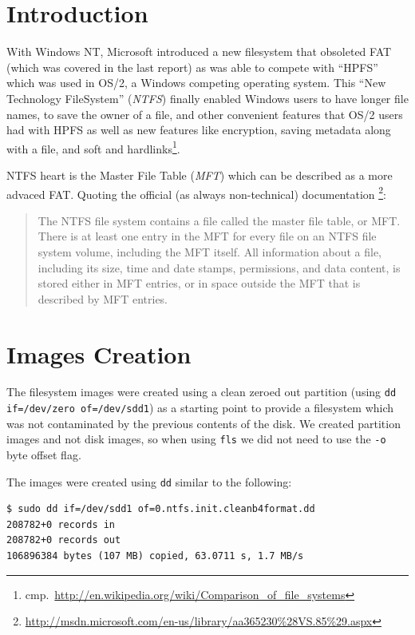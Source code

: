 \documentclass[a4paper,
    11pt,
    normalheadings,
    parindent,
    UKenglish,
    abstracton,
    ]{scrartcl}
\title{\mytitle{}}
\author{
    cand. Dipl. Inf. Tobias Müller <\href{mailto:muellet2@computing.dcu.ie?subject=ss10-forensic-lab01}{muellet2@}>, 59212333 \and
    BSc. Anthony Walters <\href{mailto:waltera3@computing.dcu.ie?subject=ss10-forensic-lab01}{waltera3@}>, 59213102
    }
\date{2009-03-19}
\begin{document}
\maketitle


\section{Introduction}
With Windows NT, Microsoft introduced a new filesystem that obsoleted FAT (which was covered in the last report) as was able to compete with ``HPFS'' which was used in OS/2, a Windows competing operating system.
This ``New Technology FileSystem'' (\emph{NTFS}) finally enabled Windows users to have longer file names, to save the owner of a file, and other convenient features that OS/2 users had with HPFS as well as new features like encryption, saving metadata along with a file, and  soft and hardlinks\footnote{cmp.\, \url{http://en.wikipedia.org/wiki/Comparison_of_file_systems}}.

NTFS heart is the Master File Table (\emph{MFT}) which can be described as a more advaced FAT.
Quoting the official (as always non-technical) documentation%
\footnote{\url{http://msdn.microsoft.com/en-us/library/aa365230\%28VS.85\%29.aspx}}:
\begin{quote}
The NTFS file system contains a file called the master file table, or MFT. There is at least one entry in the MFT for every file on an NTFS file system volume, including the MFT itself. All information about a file, including its size, time and date stamps, permissions, and data content, is stored either in MFT entries, or in space outside the MFT that is described by MFT entries.
\end{quote}


\section{Images Creation}
The filesystem images were created using a clean zeroed out partition (using \texttt{dd if=/dev/zero of=/dev/sdd1}) as a starting point to provide a filesystem which was not contaminated by the previous contents of the disk.
We created partition images and not disk images, so when using \texttt{fls} we did not need to use the \texttt{-o} byte offset flag.

The images were created using \texttt{dd} similar to the following:
\begin{verbatim}
$ sudo dd if=/dev/sdd1 of=0.ntfs.init.cleanb4format.dd
208782+0 records in
208782+0 records out
106896384 bytes (107 MB) copied, 63.0711 s, 1.7 MB/s
\end{verbatim}
\end{document}
